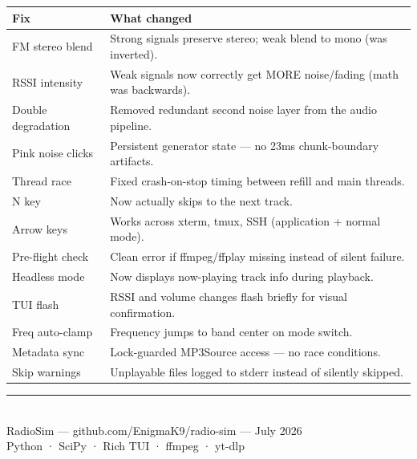 \documentclass[11pt,a4paper]{article}
\begin{document}
{\small
\begin{tabularx}{\textwidth}{@{}>{\raggedright\arraybackslash}p{4cm} X@{}}
    \toprule
    \textbf{Fix} & \textbf{What changed} \\
    \midrule
    FM stereo blend & Strong signals preserve stereo; weak blend to mono (was inverted). \\
    RSSI intensity & Weak signals now correctly get MORE noise/fading (math was backwards). \\
    Double degradation & Removed redundant second noise layer from the audio pipeline. \\
    Pink noise clicks & Persistent generator state --- no 23ms chunk-boundary artifacts. \\
    Thread race & Fixed crash-on-stop timing between refill and main threads. \\
    N key & Now actually skips to the next track. \\
    Arrow keys & Works across xterm, tmux, SSH (application + normal mode). \\
    Pre-flight check & Clean error if ffmpeg/ffplay missing instead of silent failure. \\
    Headless mode & Now displays now-playing track info during playback. \\
    TUI flash & RSSI and volume changes flash briefly for visual confirmation. \\
    Freq auto-clamp & Frequency jumps to band center on mode switch. \\
    Metadata sync & Lock-guarded MP3Source access --- no race conditions. \\
    Skip warnings & Unplayable files logged to stderr instead of silently skipped. \\
    \bottomrule
\end{tabularx}
}

\vspace{5mm}
\begin{center}
\rule{0.5\textwidth}{0.4pt}\\[2mm]
{\small\textcolor{radioGray}{RadioSim {\tiny —} github.com/EnigmaK9/radio-sim {\tiny —} July 2026}}\\[1mm]
{\small\textcolor{radioGray}{Python {\tiny ·} SciPy {\tiny ·} Rich TUI {\tiny ·} ffmpeg {\tiny ·} yt-dlp}}
\end{center}
\end{document}
